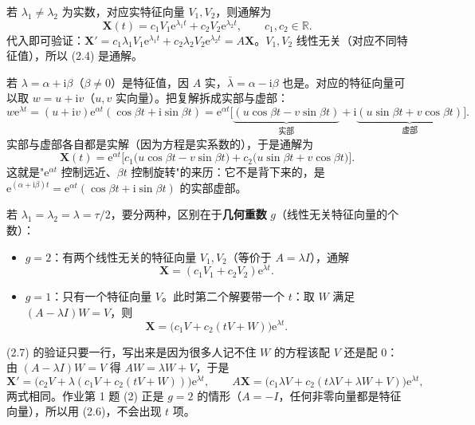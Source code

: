 \documentclass[11pt]{ctexart}
\newcommand{\X}{\mathbf{X}}\newcommand{\Y}{\mathbf{Y}}
\begin{document}

若 $\lambda_1\neq\lambda_2$ 为实数，对应实特征向量 $V_1,V_2$，则通解为
\[
\X(t)=c_1 V_1\mathrm{e}^{\lambda_1 t}+c_2 V_2\mathrm{e}^{\lambda_2 t},
\qquad c_1,c_2\in\mathbb{R}.
\tag{2.4}
\]
代入即可验证：$\X'=c_1\lambda_1V_1\mathrm{e}^{\lambda_1t}+c_2\lambda_2V_2\mathrm{e}^{\lambda_2t}=A\X$。$V_1,V_2$ 线性无关（对应不同特征值），所以 (2.4) 是通解。


若 $\lambda=\alpha+\mathrm{i}\beta$（$\beta\neq0$）是特征值，因 $A$ 实，$\bar\lambda=\alpha-\mathrm{i}\beta$ 也是。对应的特征向量可以取 $w=u+\mathrm{i}v$（$u,v$ 实向量）。把复解拆成实部与虚部：
\[
w\mathrm{e}^{\lambda t}=(u+\mathrm{i}v)\mathrm{e}^{\alpha t}(\cos\beta t+\mathrm{i}\sin\beta t)
=\mathrm{e}^{\alpha t}\Big[\underbrace{(u\cos\beta t-v\sin\beta t)}_{\text{实部}}
+\mathrm{i}\underbrace{(u\sin\beta t+v\cos\beta t)}_{\text{虚部}}\Big].
\]
实部与虚部各自都是实解（因为方程是实系数的），于是通解为
\[
\X(t)=\mathrm{e}^{\alpha t}\Big[c_1\big(u\cos\beta t-v\sin\beta t\big)
+c_2\big(u\sin\beta t+v\cos\beta t\big)\Big].
\tag{2.5}
\]
这就是"$\mathrm{e}^{\alpha t}$ 控制远近、$\beta t$ 控制旋转"的来历：它不是背下来的，是 $\mathrm{e}^{(\alpha+\mathrm{i}\beta)t}=\mathrm{e}^{\alpha t}(\cos\beta t+\mathrm{i}\sin\beta t)$ 的实部虚部。


若 $\lambda_1=\lambda_2=\lambda=\tau/2$，要分两种，区别在于\textbf{几何重数} $g$（线性无关特征向量的个数）：

\begin{itemize}
\item $g=2$：有两个线性无关的特征向量 $V_1,V_2$（等价于 $A=\lambda I$），通解
\[
\X=(c_1V_1+c_2V_2)\mathrm{e}^{\lambda t}.
\tag{2.6}
\]
\item $g=1$：只有一个特征向量 $V$。此时第二个解要带一个 $t$：取 $W$ 满足 $(A-\lambda I)W=V$，则
\[
\X=\big(c_1V+c_2(tV+W)\big)\mathrm{e}^{\lambda t}.
\tag{2.7}
\]
\end{itemize}

(2.7) 的验证只要一行，写出来是因为很多人记不住 $W$ 的方程该配 $V$ 还是配 $0$：由 $(A-\lambda I)W=V$ 得 $AW=\lambda W+V$，于是
\[
\X'=\big(c_2V+\lambda(c_1V+c_2(tV+W))\big)\mathrm{e}^{\lambda t},\qquad
A\X=\big(c_1\lambda V+c_2(t\lambda V+\lambda W+V)\big)\mathrm{e}^{\lambda t},
\]
两式相同。作业第 1 题 (2) 正是 $g=2$ 的情形（$A=-I$，任何非零向量都是特征向量），所以用 (2.6)，不会出现 $t$ 项。
\end{document}
